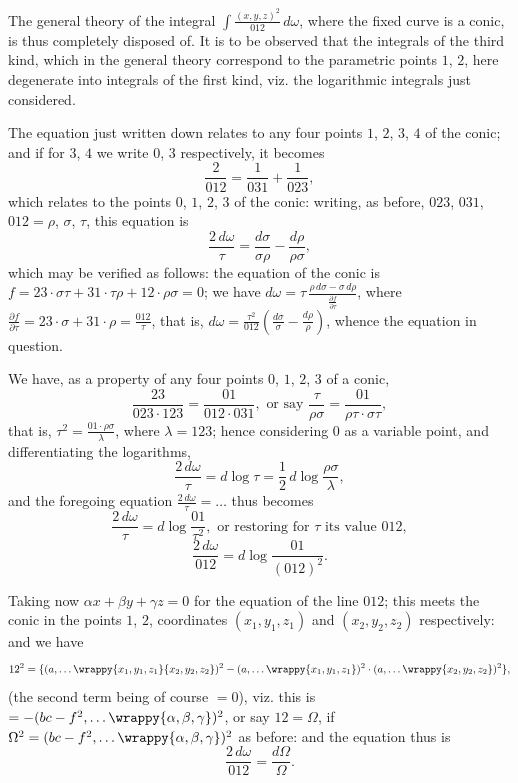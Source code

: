 \documentclass[11pt,a4paper]{book}
\begin{document}
\begin{art}\label{art:94}
The general theory of the integral $\int \frac{(x, y, z)^2}{012}\,d\omega$, where the fixed curve is a conic, is thus completely disposed of. It is to be observed that the integrals of the third kind, which in the general theory correspond to the parametric points $1$, $2$, here degenerate into integrals of the first kind, viz. the logarithmic integrals just considered.
\end{art}

\begin{art}\label{art:95}
The equation just written down relates to any four points $1$, $2$, $3$, $4$ of the conic; and if for $3$, $4$ we write $0$, $3$ respectively, it becomes
\[
\frac{2}{012} = \frac{1}{031} + \frac{1}{023},
\]
which relates to the points $0$, $1$, $2$, $3$ of the conic: writing, as before, $023$, $031$, $012 = \rho$, $\sigma$, $\tau$, this equation is
\[
\frac{2\,d\omega}{\tau} = \frac{d\sigma}{\sigma\rho} - \frac{d\rho}{\rho\sigma},
\]
which may be verified as follows: the equation of the conic is $f = 23\cdot\sigma\tau + 31\cdot\tau\rho + 12\cdot\rho\sigma = 0$; we have $d\omega = \tau\,\frac{\rho\,d\sigma - \sigma\,d\rho}{\frac{\partial f}{\partial \tau}}$, where $\frac{\partial f}{\partial \tau} = 23\cdot\sigma + 31\cdot\rho = \frac{012}{\tau}$, that is, $d\omega = \frac{\tau^2}{012}(\frac{d\sigma}{\sigma} - \frac{d\rho}{\rho})$, whence the equation in question.
\end{art}

\newpage
\begin{art}\label{art:96}
We have, as a property of any four points $0$, $1$, $2$, $3$ of a conic,
\[
\frac{23}{023 \cdot 123} = \frac{01}{012 \cdot 031}, \text{ or say } \frac{\tau}{\rho\sigma} = \frac{01}{\rho\tau \cdot \sigma\tau},
\]
that is, $\tau^2 = \frac{01 \cdot \rho\sigma}{\lambda}$, where $\lambda = 123$; hence considering $0$ as a variable point, and differentiating the logarithms,
\[
\frac{2\,d\omega}{\tau} = d\log\tau = \frac{1}{2}\,d\log\frac{\rho\sigma}{\lambda},
\]
and the foregoing equation $\frac{2\,d\omega}{\tau} = \ldots$ thus becomes
\[
\frac{2\,d\omega}{\tau} = d\log\frac{01}{\tau^2}, \text{ or restoring for } \tau \text{ its value } 012,
\]
\[
\frac{2\,d\omega}{012} = d\log\frac{01}{(012)^2}.
\]

Taking now $\alpha x + \beta y + \gamma z = 0$ for the equation of the line $012$; this meets the conic in the points $1$, $2$, coordinates $(x_1, y_1, z_1)$ and $(x_2, y_2, z_2)$ respectively: and we have
\[
12^2 = \{(a, \ldots \wrappy{x_1, y_1, z_1}{x_2, y_2, z_2})^2 - (a, \ldots \wrappy{x_1, y_1, z_1})^2 \cdot (a, \ldots \wrappy{x_2, y_2, z_2})^2\},
\]
(the second term being of course $= 0$), viz. this is $= -(bc - f^2, \ldots \wrappy{\alpha, \beta, \gamma})^2$, or say $12 = \Omega$, if $\Omega^2 = (bc - f^2, \ldots \wrappy{\alpha, \beta, \gamma})^2$ as before: and the equation thus is
\[
\frac{2\,d\omega}{012} = \frac{d\Omega}{\Omega}.
\]
\end{art}
\end{document}

